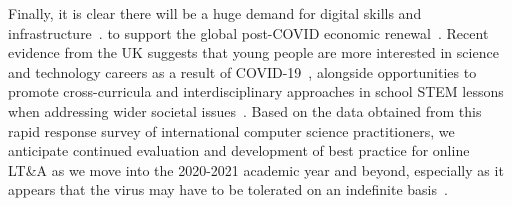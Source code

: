 \documentclass[sigconf]{acmart}
\begin{document}
Finally, it is clear there will be a huge demand for digital skills
and
infrastructure~\cite{tryfonas+crick:petra2018,davenport-et-al:educon2020,baker:2020}.
to support the global post-COVID economic
renewal~\cite{nadellaft:2020}. Recent evidence from the UK suggests
that young people are more interested in science and technology
careers as a result of COVID-19~\cite{bsasciecareers:2020}, alongside
opportunities to promote cross-curricula and interdisciplinary
approaches in school STEM lessons when addressing wider societal
issues~\cite{reiss:2020}. Based on the data obtained from this rapid
response survey of international computer science practitioners, we
anticipate continued evaluation and development of best practice for
online LT\&A as we move into the 2020-2021 academic year and beyond,
especially as it appears that the virus may have to be tolerated on an
indefinite basis~\cite{kissler-et-al:2020}.





\end{document}
